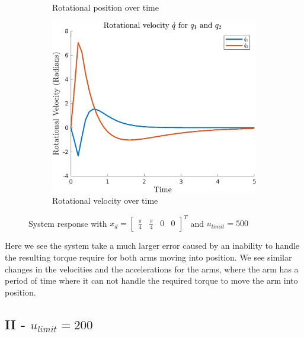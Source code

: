 \documentclass{article}
\begin{document}
\begin{figure}[H]
\begin{subfigure}{0.325\textwidth}
        \caption{Rotational position over time}
    \end{subfigure}
    \begin{subfigure}{0.325\textwidth}
        \centering
        \includegraphics[width = \textwidth]{figures/rotational-velocity-d1.png}
        \caption{Rotational velocity over time}
    \end{subfigure}
    \caption{System response with $x_d=\begin{bmatrix} \frac{\pi}{4} & \frac{\pi}{4} & 0 & 0 \end{bmatrix}^T$ and $u_{limit} = 500$}
    \label{fig:d-1_results}
\end{figure}

Here we see the system take a much larger error caused by an inability to handle the resulting torque require for both arms moving into position. We see similar changes in the velocities and the accelerations for the arms, where the arm has a period of time where it can not handle the required torque to move the arm into position.

\subsection*{II - $u_{limit} = 200$}
\end{document}
